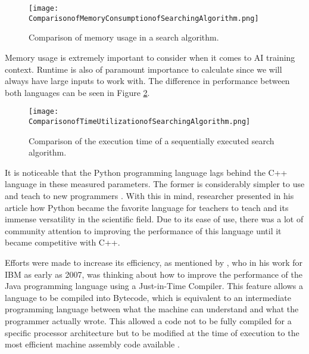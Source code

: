 \begin{figure}[!ht]
    \centering
    \texttt{[image: ComparisonofMemoryConsumptionofSearchingAlgorithm.png]}
    \caption[a]{Comparison of memory usage in a search algorithm\footnotemark.}
    \label{fig:comparisonMemorycppvspython}
\end{figure}


Memory usage is extremely important to consider when it comes to AI training context. Runtime is also of paramount importance to calculate since we will always have large inputs to work with. The difference in performance between both languages can be seen in Figure \ref{fig:speedcppvspython}.

\begin{figure}[!ht]
    \centering
    \texttt{[image: ComparisonofTimeUtilizationofSearchingAlgorithm.png]}
    \caption[a]{Comparison of the execution time of a sequentially executed search algorithm\footnotemark.}
    \label{fig:speedcppvspython}
\end{figure}


It is noticeable that the Python programming language lags behind the C++ language in these measured parameters. The former is considerably simpler to use and teach to new programmers \cite{C++vsPython}. With this in mind, researcher \citeauthor{HPC_Python} presented in his article  how Python became the favorite language for teachers to teach and its immense versatility in the scientific field. Due to its ease of use, there was a lot of community attention to improving the performance of this language until it became competitive with C++.

Efforts were made to increase its efficiency, as mentioned by \citeauthor{JIT}, who in his work for IBM as early as 2007, was thinking about how to improve the performance of the Java programming language using a Just-in-Time Compiler. This feature allows a language to be compiled into Bytecode, which is equivalent to an intermediate programming language between what the machine can understand and what the programmer actually wrote. This allowed a code not to be fully compiled for a specific processor architecture but to be modified at the time of execution to the most efficient machine assembly code available \cite{JIT}.


